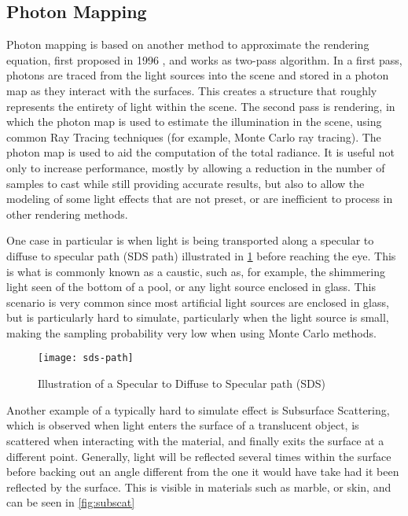 \documentclass[main.tex]{subfiles}
\begin{document}
\subsection{Photon Mapping}

Photon mapping is based on another method to approximate the rendering equation, first proposed in 1996 \cite{jensen1996global}, and works as two-pass algorithm. In a first pass, photons are traced from the light sources into the scene and stored in a photon map as they interact with the surfaces. This creates a structure that roughly represents the entirety of light within the scene. The second pass is rendering, in which the photon map is used to estimate the illumination in the scene, using common Ray Tracing techniques (for example, Monte Carlo ray tracing). The photon map is used to aid the computation of the total radiance. It is useful not only to increase performance, mostly by allowing a reduction in the number of samples to cast while still providing accurate results, but also to allow the modeling of some light effects that are not preset, or are inefficient to process in other rendering methods.

One case in particular is when light is being transported along a specular to diffuse to specular path (SDS path) illustrated in \cref{fig:sdspath} before reaching the eye. This is what is commonly known as a caustic, such as, for example, the shimmering light seen of the bottom of a pool, or any light source enclosed in glass. This scenario is very common since most artificial light sources are enclosed in glass, but is particularly hard to simulate, particularly when the light source is small, making the sampling probability very low when using Monte Carlo methods.

\begin{figure}[!htp]
  \centering
  \texttt{[image: sds-path]}
  \caption{Illustration of a Specular to Diffuse to Specular path (SDS) \label{fig:sdspath}}
\end{figure}

Another example of a typically hard to simulate effect is Subsurface Scattering, which is observed when light enters the surface of a translucent object, is scattered when interacting with the material, and finally exits the surface at a different point. Generally, light will be reflected several times within the surface before backing out an angle different from the one it would have take had it been reflected by the surface. This is visible in materials such as marble, or skin, and can be seen in \cref{fig:subscat}
\end{document}
